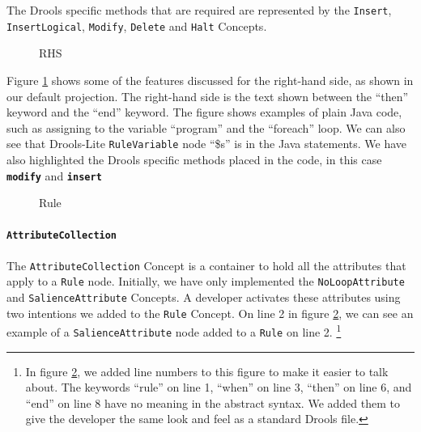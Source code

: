 The Drools specific methods that are required are represented by the \texttt{Insert}, \texttt{InsertLogical}, \texttt{Modify}, \texttt{Delete} and \texttt{Halt} Concepts.

\begin{figure}[h]
    \centering
    \caption{RHS}
    \label{fig:RHS}
\end{figure}

Figure \ref{fig:RHS} shows some of the features discussed for the right-hand side, as shown in our default projection.
The right-hand side is the text shown between the ``then'' keyword and the ``end'' keyword.
The figure shows examples of plain Java code, such as assigning to the variable ``program'' and the ``foreach'' loop.
We can also see that Drools-Lite \texttt{RuleVariable} node ``\$s'' is in the Java statements.
We have also highlighted the Drools specific methods placed in the code, in this case \texttt{\textbf{modify}} and \texttt{\textbf{insert}}   

\begin{figure}[h]
    \centering
    \caption{Rule}
    \label{fig:Rule}
\end{figure}

\paragraph{\texttt{AttributeCollection}} The \texttt{AttributeCollection} Concept is a container to hold all the attributes that apply to a \texttt{Rule} node.
Initially, we have only implemented the \texttt{NoLoopAttribute} and \texttt{SalienceAttribute} Concepts.
A developer activates these attributes using two intentions we added to the \texttt{Rule} Concept.
On line 2 in figure \ref{fig:Rule}, we can see an example of a \texttt{SalienceAttribute} node added to a \texttt{Rule} on line 2.
\footnote{In figure \ref{fig:Rule}, we added line numbers to this figure to make it easier to talk about.
The keywords ``rule'' on line 1, ``when'' on line 3, ``then'' on line 6, and ``end'' on line 8 have no meaning in the abstract syntax.
We added them to give the developer the same look and feel as a standard Drools file.}

